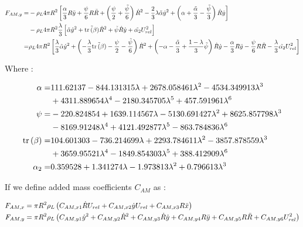 \begin{align}
\nonumber F_{AM,y}=&-\rho_{L}4\pi R^{2}\left[ \frac{\alpha}{3}R\ddot{y}+\frac{\psi}{6}R \ddot{R} + \left( \frac{\psi}{2} +\frac{\tilde{\psi}}{6} \right)\dot{R}^{2} -\frac{2}{3}\lambda \tilde{\alpha} \dot{y}^{2} + \left(  \alpha + \frac{\tilde{\alpha}}{3} - \frac{\tilde{\psi}}{3}  \right)\dot{R}\dot{y}  \right] \\
&-\rho_{L}4\pi R^{2}\frac{\lambda}{3}\left[ \tilde{\alpha}\dot{y}^{2}+\tilde{\mathrm{tr}\left( \beta \right)}\dot{R}^{2}+\tilde{\psi}\dot{R}\dot{y}+\tilde{\alpha_{2}}U_{rel}^{2} \right]\\
=&\rho_{L}4\pi R^{2}\left[ \frac{\lambda}{3}\tilde{\alpha}\dot{y}^{2}+\left( -\frac{\lambda}{3}\tilde{\mathrm{tr}\left( \beta \right)}-\frac{\psi}{2}-\frac{\tilde{\psi}}{6} \right)\dot{R}^2+\left( -\alpha - \frac{\tilde{\alpha}}{3}+\frac{1-\lambda}{3}\tilde{\psi} \right)\dot{R} \dot{y} - \frac{\alpha}{3}R\ddot{y} - \frac{\psi}{6}R \ddot{R}-\frac{\lambda}{3}\tilde{\alpha_{2}}U_{rel}^{2}  \right]  
\end{align}

Where :

\begin{align}
\nonumber \alpha = &111.62137 - 844.131315 \lambda + 2678.058461 \lambda^{2} - 4534.349913 \lambda^{3} \\ &+ 4311.889654 \lambda^{4} - 2180.345705 \lambda^{5} + 457.591961 \lambda^{6}\\
\nonumber \psi = &-220.824854 + 1639.114567 \lambda - 5130.691427 \lambda^{2} + 8625.857798 \lambda^{3} \\ &- 8169.91248 \lambda^{4} + 4121.492877 \lambda^{5} - 863.784836 \lambda^{6}\\
\nonumber \mathrm{tr}\left( \beta \right) = &104.601303 - 736.214699 \lambda + 2293.784611 \lambda^{2} - 3857.878559 \lambda^{3} \\ &+ 3659.95521 \lambda^{4} - 1849.854303 \lambda^{5} + 388.412909 \lambda^{6}\\
\alpha_{2}= &0.359528 + 1.341274 \lambda - 1.973813 \lambda^{2} + 0.796613 \lambda^{3}
\end{align}


If we define added mass coefficients $C_{AM}$ as :

\begin{align}
F_{AM,x}&=\pi R^{2}\rho_{L}\left( C_{AM,x1}\dot{R}U_{rel}+C_{AM,x2}\dot{y}U_{rel}+C_{AM,x3}R\ddot{x} \right)\\
F_{AM,y}&=\pi R^{2}\rho_{L}\left( C_{AM,y1}\dot{y}^{2}+C_{AM,y2}\dot{R}^{2}+C_{AM,y3}\dot{R}\dot{y}+C_{AM,y4}R\ddot{y} + C_{AM,y5}R\ddot{R}+C_{AM,y6}U_{rel}^{2} \right)
\end{align}

